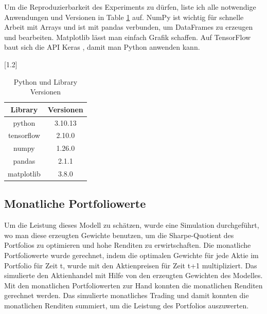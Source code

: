 \documentclass[12pt]{article}
\begin{document}
            Um die Reproduzierbarkeit des Experiments zu dürfen, 
            liste ich alle notwendige Anwendungen und Versionen in Table \ref{pl-versionen} auf.    
            NumPy \cite{harris2020-numpy} ist wichtig für schnelle Arbeit mit Arrays und ist mit 
            pandas \cite{reback2020-pandas} \cite{mckinney2010-pandas} verbunden, um DataFrames zu erzeugen und bearbeiten. 
            Matplotlib \cite{hunter2007-matplotlib} lässt man einfach Grafik schaffen. 
            Auf TensorFlow \cite{tensorflow2016} baut sich die API Keras \cite{chollet2015-keras}, damit man Python anwenden kann.
                
                
            \begin{table}[htp]

                \begin{center} 

                \scalebox{1.2}[1.2]{
                \begin{tabular}{ | c | c | }
                \hline
                \textbf{Library}    &       \textbf{Versionen} \\
                \hline
                python              &       3.10.13 \\ 
                tensorflow          &       2.10.0 \\
                numpy               &       1.26.0 \\
                pandas              &       2.1.1 \\
                matplotlib          &       3.8.0 \\
                
                \hline
                \end{tabular}
                }

                \caption{Python und Library Versionen}
                \label{pl-versionen}

                \end{center}

            \end{table}
       

        \subsection{Monatliche Portfoliowerte}

            Um die Leistung dieses Modell zu schätzen, wurde eine Simulation durchgeführt, 
            wo man diese erzeugten Gewichte benutzen, um die Sharpe-Quotient des Portfolios zu optimieren und 
            hohe Renditen zu erwirtschaften. Die monatliche Portfoliowerte wurde gerechnet, 
            indem die optimalen Gewichte für jede Aktie im Portfolio für Zeit t, 
            wurde mit den Aktienpreisen für Zeit t+1 multipliziert. 
            Das simulierte den Aktienhandel mit Hilfe von den erzeugten Gewichten des Modelles. 
            Mit den monatlichen Portfoliowerten zur Hand konnten die monatlichen Renditen gerechnet werden. 
            Das simulierte monatliches Trading und damit konnten die monatlichen Renditen summiert, 
            um die Leistung des Portfolios auszuwerten.
\end{document}
